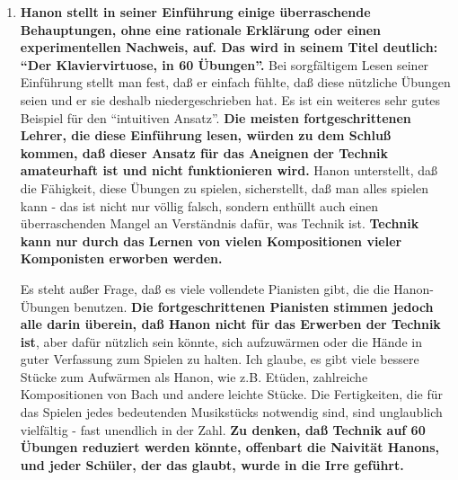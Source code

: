 \begin{enumerate}[label={\roman*.}]  

\item \label{c1iii7h1}\textbf{Hanon stellt in seiner Einführung einige überraschende Behauptungen, ohne eine rationale Erklärung oder einen experimentellen Nachweis, auf.
Das wird in seinem Titel deutlich: \enquote{Der Klaviervirtuose, in 60 Übungen}.}
Bei sorgfältigem Lesen seiner Einführung stellt man fest, daß er einfach fühlte, daß diese nützliche Übungen seien und er sie deshalb niedergeschrieben hat.
Es ist ein weiteres sehr gutes Beispiel für den \enquote{intuitiven Ansatz}.
\textbf{Die meisten fortgeschrittenen Lehrer, die diese Einführung lesen, würden zu dem Schluß kommen, daß dieser Ansatz für das Aneignen der Technik amateurhaft ist und nicht funktionieren wird.}
Hanon unterstellt, daß die Fähigkeit, diese Übungen zu spielen, sicherstellt, daß man alles spielen kann - das ist nicht nur völlig falsch, sondern enthüllt auch einen überraschenden Mangel an Verständnis dafür, was Technik ist.
\textbf{Technik kann nur durch das Lernen von vielen Kompositionen vieler Komponisten erworben werden.}

Es steht außer Frage, daß es viele vollendete Pianisten gibt, die die Hanon-Übungen benutzen.
\textbf{Die fortgeschrittenen Pianisten stimmen jedoch alle darin überein, daß Hanon nicht für das Erwerben der Technik ist}, aber dafür nützlich sein könnte, sich aufzuwärmen oder die Hände in guter Verfassung zum Spielen zu halten.
Ich glaube, es gibt viele bessere Stücke zum Aufwärmen als Hanon, wie z.B. Etüden, zahlreiche Kompositionen von Bach und andere leichte Stücke.
Die Fertigkeiten, die für das Spielen jedes bedeutenden Musikstücks notwendig sind, sind unglaublich vielfältig - fast unendlich in der Zahl.
\textbf{Zu denken, daß Technik auf 60 Übungen reduziert werden könnte, offenbart die Naivität Hanons, und jeder Schüler, der das glaubt, wurde in die Irre geführt.}



\end{enumerate}
